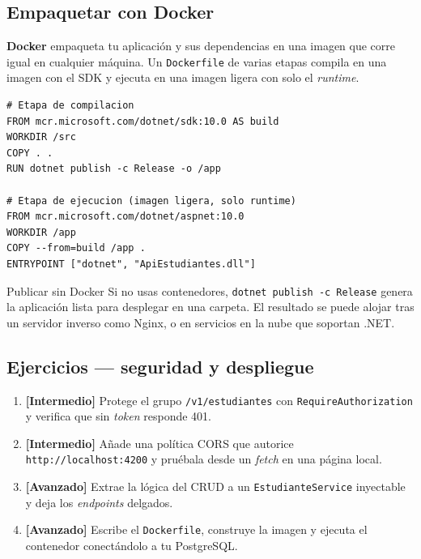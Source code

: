 \documentclass[11pt]{article}
\begin{document}
\subsection{Empaquetar con Docker}
\textbf{Docker} empaqueta tu aplicación y sus dependencias en una imagen que corre igual en cualquier máquina. Un \texttt{Dockerfile} de varias etapas compila en una imagen con el SDK y ejecuta en una imagen ligera con solo el \emph{runtime}.

\begin{cajacodigo}
\begin{lstlisting}[style=shell]
# Etapa de compilacion
FROM mcr.microsoft.com/dotnet/sdk:10.0 AS build
WORKDIR /src
COPY . .
RUN dotnet publish -c Release -o /app

# Etapa de ejecucion (imagen ligera, solo runtime)
FROM mcr.microsoft.com/dotnet/aspnet:10.0
WORKDIR /app
COPY --from=build /app .
ENTRYPOINT ["dotnet", "ApiEstudiantes.dll"]
\end{lstlisting}
\end{cajacodigo}
\vspace{2pt}
\begin{cajatip}{Publicar sin Docker}
Si no usas contenedores, \texttt{dotnet publish -c Release} genera la aplicación lista para desplegar en una carpeta. El resultado se puede alojar tras un servidor inverso como Nginx, o en servicios en la nube que soportan .NET.\par
\end{cajatip}

\subsection{Ejercicios — seguridad y despliegue}
\begin{enumerate}[leftmargin=1.7em,itemsep=3pt,topsep=2pt]
\item \textbf{[Intermedio]} Protege el grupo \texttt{/v1/estudiantes} con \texttt{RequireAuthorization} y verifica que sin \emph{token} responde 401.
\item \textbf{[Intermedio]} Añade una política CORS que autorice \texttt{http://localhost:4200} y pruébala desde un \emph{fetch} en una página local.
\item \textbf{[Avanzado]} Extrae la lógica del CRUD a un \texttt{EstudianteService} inyectable y deja los \emph{endpoints} delgados.
\item \textbf{[Avanzado]} Escribe el \texttt{Dockerfile}, construye la imagen y ejecuta el contenedor conectándolo a tu PostgreSQL.
\end{enumerate}
\end{document}
